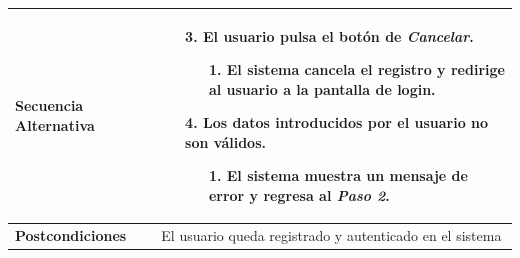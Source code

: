 \begin{longtable}{| p{4cm} | p{10cm} |}
\hline
\textbf{Secuencia Alternativa} &\mbox{}\par\vspace{-\baselineskip}
\begin{enumerate}[leftmargin=0.9cm, topsep=0.1cm]
\item[3.] El usuario pulsa el botón de \textit{Cancelar}.
	\begin{itemize}
	\item[1.] El sistema cancela el registro y redirige al usuario a la pantalla de login.
	\end{itemize}
\item[4.] Los datos introducidos por el usuario no son válidos.
	\begin{itemize}
	\item[1.] El sistema muestra un mensaje de error y regresa al \textit{Paso 2}.
	\end{itemize}
\end{enumerate}\\

\hline
\textbf{Postcondiciones} & 
El usuario queda registrado y autenticado en el sistema\\
\hline
\end{longtable}




\newpage
